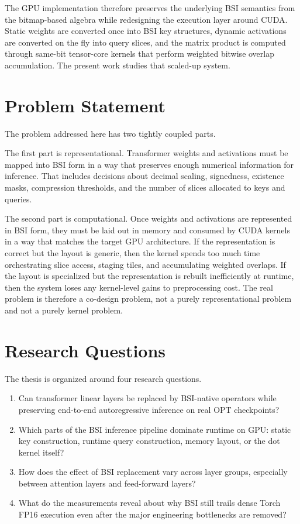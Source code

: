 The GPU implementation therefore preserves the underlying BSI semantics from the bitmap-based algebra while redesigning the execution layer around CUDA. Static weights are converted once into BSI key structures, dynamic activations are converted on the fly into query slices, and the matrix product is computed through same-bit tensor-core kernels that perform weighted bitwise overlap accumulation. The present work studies that scaled-up system.

\section{Problem Statement}
The problem addressed here has two tightly coupled parts.

The first part is representational. Transformer weights and activations must be mapped into BSI form in a way that preserves enough numerical information for inference. That includes decisions about decimal scaling, signedness, existence masks, compression thresholds, and the number of slices allocated to keys and queries.

The second part is computational. Once weights and activations are represented in BSI form, they must be laid out in memory and consumed by CUDA kernels in a way that matches the target GPU architecture. If the representation is correct but the layout is generic, then the kernel spends too much time orchestrating slice access, staging tiles, and accumulating weighted overlaps. If the layout is specialized but the representation is rebuilt inefficiently at runtime, then the system loses any kernel-level gains to preprocessing cost. The real problem is therefore a co-design problem, not a purely representational problem and not a purely kernel problem.

\section{Research Questions}
The thesis is organized around four research questions.

\begin{enumerate}[leftmargin=2em]
\item Can transformer linear layers be replaced by BSI-native operators while preserving end-to-end autoregressive inference on real OPT checkpoints?
\item Which parts of the BSI inference pipeline dominate runtime on GPU: static key construction, runtime query construction, memory layout, or the dot kernel itself?
\item How does the effect of BSI replacement vary across layer groups, especially between attention layers and feed-forward layers?
\item What do the measurements reveal about why BSI still trails dense Torch FP16 execution even after the major engineering bottlenecks are removed?
\end{enumerate}

